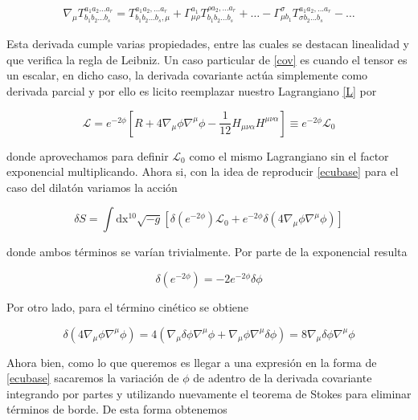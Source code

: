 \documentclass{article}
\numberwithin{equation}{section}
\begin{document}
\begin{equation}\label{cov}
\begin{aligned}
\nabla_{\mu} T^{a_1a_2...a_r}_{b_1b_2...b_s} = T^{a_1a_2,...a_r}_{b_1b_2...b_s,\mu}
+ \Gamma^{a_1}_{\mu \rho}T^{\rho a_2,...a_r}_{b_1 b_2...b_s} + \dots - \Gamma^{\sigma}_{\mu b_1}T^{a_1 a_2,...a_r}_{\sigma b_2...b_s} - \dots
\end{aligned}
\end{equation}

Esta derivada cumple varias propiedades, entre las cuales se destacan linealidad y que verifica la regla de Leibniz. Un caso particular de \ref{cov} es cuando el tensor es un escalar, en dicho caso, la derivada covariante actúa simplemente como derivada parcial y por ello es licito reemplazar nuestro Lagrangiano \ref{L} por

\begin{equation*}
\mathscr{L}= e^{-2\phi}\left[R + 4 \nabla_{\mu}\phi\nabla^{\mu} \phi - \frac{1}{12} H_{\mu \nu \alpha}H^{\mu \nu \alpha}\right] \equiv e^{-2\phi} \mathscr{L}_0
\end{equation*}

donde aprovechamos para definir $ \mathscr{L}_0 $ como el mismo Lagrangiano sin el factor exponencial multiplicando. Ahora si, con la idea de reproducir \ref{ecubase} para el caso del dilatón variamos la acción

\begin{equation*}
 \delta S = \int\mathrm{dx^{10}}\sqrt{-g} \left[ \delta \left(e^{-2\phi}\right) \mathscr{L}_0  + e^{-2\phi} \delta \left( 4 \nabla_{\mu}\phi\nabla^{\mu} \phi \right) \right]
\end{equation*}

donde ambos términos se varían trivialmente. Por parte de la exponencial resulta

\begin{equation*}
\delta \left(e^{-2\phi}\right) = -2 e^{-2\phi} \delta \phi 
\end{equation*}

Por otro lado, para el término cinético se obtiene

\begin{equation*}
\delta \left( 4 \nabla_{\mu}\phi\nabla^{\mu} \phi \right) = 4 \left( \nabla_{\mu} \delta \phi \nabla^{\mu} \phi + \nabla_{\mu} \phi \nabla^{\mu} \delta \phi \right) = 8 \nabla_{\mu} \delta \phi \nabla^{\mu} \phi
\end{equation*}

Ahora bien, como lo que queremos es llegar a una expresión en la forma de \ref{ecubase} sacaremos la variación de $ \phi $ de adentro de la derivada covariante integrando por partes y utilizando nuevamente el teorema de Stokes para eliminar términos de borde. De esta forma obtenemos
\end{document}
